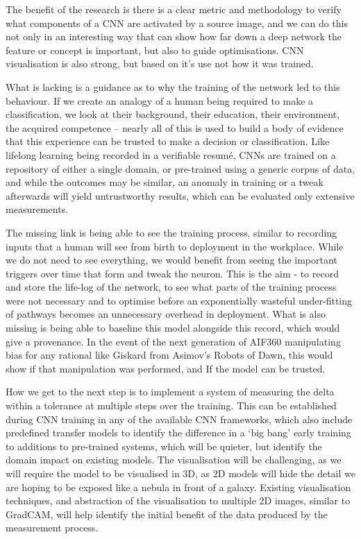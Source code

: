 The benefit of the research is there is a clear metric and methodology to verify what components of a CNN are activated by a source image, and we can do this not only in an interesting way that can show how far down a deep network the feature or concept is important, but also to guide optimisations. CNN visualisation is also strong, but based on it's use not how it was trained.

What is lacking is a guidance as to why the training of the network led to this behaviour. If we create an analogy of a human being required to make a classification, we look at their background, their education, their environment, the acquired competence – nearly all of this is used to build a body of evidence that this experience can be trusted to make a decision or classification. Like lifelong learning being recorded in a verifiable resumé, CNNs are trained on a repository of either a single domain, or pre-trained using a generic corpus of data, and while the outcomes may be similar, an anomaly in training or a tweak afterwards will yield untrustworthy results, which can be evaluated only extensive measurements.

The missing link is being able to see the training process, similar to recording inputs that a human will see from birth to deployment in the workplace. While we do not need to see everything, we would benefit from seeing the important triggers over time that form and tweak the neuron. This is the aim - to record and store the life-log of the network, to see what parts of the training process were not necessary and to optimise before an exponentially wasteful under-fitting of pathways becomes an unnecessary overhead in deployment. What is also missing is being able to baseline this model alongside this record, which would give a provenance. In the event of the next generation of AIF360 manipulating bias for any rational like Giskard from Asimov’s Robots of Dawn, this would show if that manipulation was performed, and If the model can be trusted.

How we get to the next step is to implement a system of measuring the delta within a tolerance at multiple steps over the training. This can be established during CNN training in any of the available CNN frameworks, which also include predefined transfer models to identify the difference in a ‘big bang’ early training to additions to pre-trained systems, which will be quieter, but identify the domain impact on existing models. The visualisation will be challenging, as we will require the model to be visualised in 3D, as 2D models will hide the detail we are hoping to be exposed like a nebula in front of a galaxy. Existing visualisation techniques, and abstraction of the visualisation to multiple 2D images, similar to GradCAM, will help identify the initial benefit of the data produced by the measurement process.
